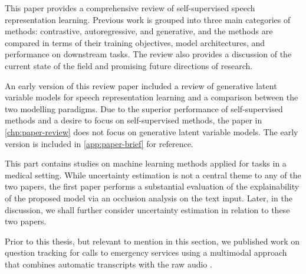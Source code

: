 This paper provides a comprehensive review of self-supervised speech representation learning. Previous work is grouped into three main categories of methods: contrastive, autoregressive, and generative, and the methods are compared in terms of their training objectives, model architectures, and performance on downstream tasks. The review also provides a discussion of the current state of the field and promising future directions of research. 

An early version of this review paper \cite{borgholt_brief_2022} included a review of generative latent variable models for speech representation learning and a comparison between the two modelling paradigms. Due to the superior performance of self-supervised methods and a desire to focus on self-supervised methods, the paper in \cref{chp:paper-review} does not focus on generative latent variable models. The early version is included in \cref{app:paper-brief} for reference.


 
This part contains studies on machine learning methods applied for tasks in a medical setting. While uncertainty estimation is not a central theme to any of the two papers, the first paper performs a substantial evaluation of the explainability of the proposed model via an occlusion analysis on the text input. Later, in the discussion, we shall further consider uncertainty estimation in relation to these two papers.

Prior to this thesis, but relevant to mention in this section, we published work on question tracking for calls to emergency services using a multimodal approach that combines automatic transcripts with the raw audio \cite{havtorn_multiqt_2020}. 





